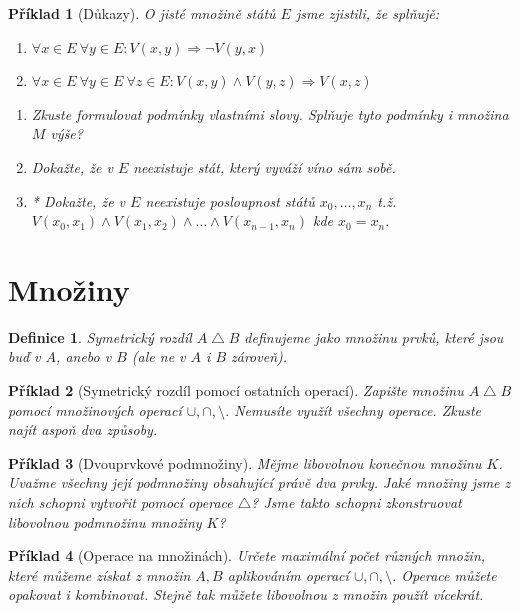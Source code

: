 \documentclass[10pt]{article}
\theoremstyle{definitionstyle}
\newtheorem{defn}{Definice}
\theoremstyle{problemstyle}
\newtheorem{problem}{Příklad}
\begin{document}
\begin{problem}[Důkazy]
O jisté množině států $E$ jsme zjistili, že splňujě:
\begin{enumerate}
    \item $\forall x \in E \ \forall y \in E: V(x,y) \Rightarrow \neg V(y,x)$
    \item $\forall x \in E \ \forall y \in E \  \forall z \in E : V(x,y) \wedge V(y,z) \Rightarrow V(x,z)$
\end{enumerate} 
\begin{enumerate}[label=(\alph*)]
    \item Zkuste formulovat podmínky vlastními slovy. Splňuje tyto podmínky i množina $M$ výše?
    \item Dokažte, že v $E$ neexistuje stát, který vyváží víno sám sobě.
    \item* Dokažte, že v $E$ neexistuje posloupnost států $x_0, \ldots , x_n$ t.ž. $V(x_0,x_1) \wedge V(x_1,x_2) \wedge \ldots \wedge  V(x_{n-1},x_n)$ kde $x_0 = x_n$.

\end{enumerate}

\end{problem}

\section{Množiny}

\begin{defn}
    Symetrický rozdíl $A \bigtriangleup B$ definujeme jako množinu prvků, které jsou buď v $A$, anebo v $B$ (ale ne v $A$ i $B$ zároveň).
\end{defn}

\begin{problem}[Symetrický rozdíl pomocí ostatních operací]
Zapište množinu $A \bigtriangleup B$ pomocí množinových operací $\cup, \cap, \setminus$. Nemusíte využít všechny operace. Zkuste najít aspoň dva způsoby.
\end{problem}

\begin{problem}[Dvouprvkové podmnožiny]
Mějme libovolnou konečnou množinu $K$. Uvažme všechny její podmnožiny obsahující právě dva prvky. Jaké množiny jsme z nich schopni vytvořit pomocí operace $\bigtriangleup$? Jsme takto schopni zkonstruovat libovolnou podmnožinu množiny $K$?
\end{problem}

\begin{problem}[Operace na množinách]
Určete maximální počet různých množin, které můžeme získat z množin $A,B$ aplikováním operací $\cup, \cap, \setminus$. Operace můžete opakovat i kombinovat. Stejně tak můžete libovolnou z množin použít vícekrát.
\end{problem}
\end{document}
